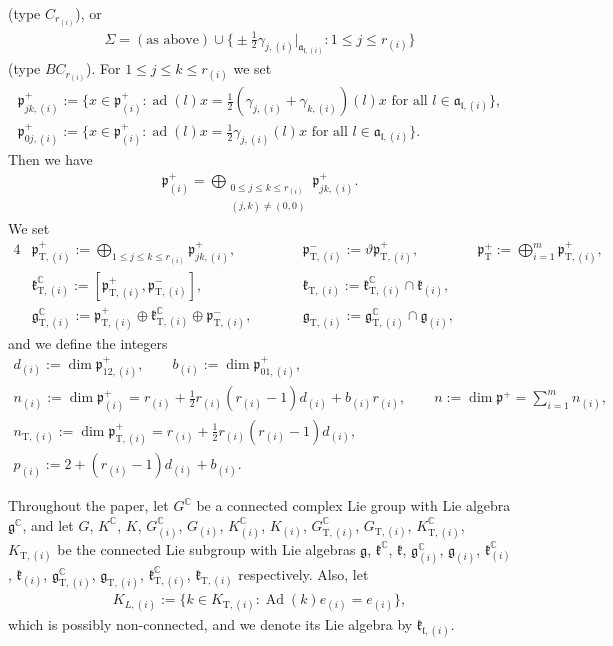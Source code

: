 \documentclass[11pt]{article}
\numberwithin{equation}{section}
\newcommand{\BC}{\mathbb{C}}
\newcommand{\fa}{\mathfrak{a}}
\newcommand{\fg}{\mathfrak{g}}
\newcommand{\fk}{\mathfrak{k}}
\newcommand{\fl}{\mathfrak{l}}
\newcommand{\fp}{\mathfrak{p}}
\newcommand{\rT}{\mathrm{T}}
\begin{document}
(type $C_{r_{(i)}}$), or
\begin{gather*} \Sigma=(\text{as above})\cup\big\{ {\pm}\tfrac{1}{2}\gamma_{j,(i)}\big|_{\fa_{\fl,(i)}}\colon 1\le j\le r_{(i)}\big\} \end{gather*}
(type $BC_{r_{(i)}}$). For $1\le j\le k\le r_{(i)}$ we set
\begin{gather*}
\fp^+_{jk,(i)} :=\big\{x\in\fp^+_{(i)}\colon \operatorname{ad}(l)x=\tfrac{1}{2}(\gamma_{j,(i)}+\gamma_{k,(i)})(l)x\text{ for all }l\in\fa_{\fl,(i)}\big\},\\
\fp^+_{0j,(i)} :=\big\{x\in\fp^+_{(i)}\colon \operatorname{ad}(l)x=\tfrac{1}{2}\gamma_{j,(i)}(l)x\text{ for all } l\in\fa_{\fl,(i)}\big\}.
\end{gather*}
Then we have
\begin{gather*} \fp^+_{(i)}=\bigoplus_{\substack{0\le j\le k\le r_{(i)}\\ (j,k)\ne (0,0)}}\fp^+_{jk,(i)}. \end{gather*}
We set
\begin{alignat*}{4}
&\fp^+_{\rT,(i)}:=\bigoplus_{1\le j\le k\le r_{(i)}}\fp^+_{jk,(i)},\qquad &&
\fp^-_{\rT,(i)}:=\vartheta\fp^+_{\rT,(i)},\qquad &&
\fp^+_{\rT}:=\bigoplus_{i=1}^m \fp^+_{\rT,(i)}, &\\
&\fk^\BC_{\rT,(i)}:=[\fp^+_{\rT,(i)},\fp^-_{\rT,(i)}], \qquad && \fk_{\rT,(i)} :=\fk^\BC_{\rT,(i)}\cap \fk_{(i)}, &&&\\
& \fg^\BC_{\rT,(i)}:=\fp^+_{\rT,(i)}\oplus \fk^\BC_{\rT,(i)}\oplus \fp^-_{\rT,(i)},\qquad && \fg_{\rT,(i)}:=\fg^\BC_{\rT,(i)}\cap \fg_{(i)},&&&
\end{alignat*}
and we define the integers
\begin{gather*}
d_{(i)} :=\dim\fp^+_{12,(i)},\qquad b_{(i)}:=\dim\fp^+_{01,(i)},\\
n_{(i)}:=\dim\fp^+_{(i)}=r_{(i)}+\tfrac{1}{2}r_{(i)}(r_{(i)}-1)d_{(i)}+b_{(i)}r_{(i)},\qquad
n:=\dim\fp^+=\sum_{i=1}^m n_{(i)},\\
n_{\rT,(i)}:=\dim\fp^+_{\rT,(i)}=r_{(i)}+\tfrac{1}{2}r_{(i)}(r_{(i)}-1)d_{(i)},\\
p_{(i)}:=2+(r_{(i)}-1)d_{(i)}+b_{(i)}.
\end{gather*}

Throughout the paper, let $G^\BC$ be a connected complex Lie group with Lie algebra $\fg^\BC$, and let
$G$, $K^\BC$, $K$, $G^\BC_{(i)}$, $G_{(i)}$, $K^\BC_{(i)}$, $K_{(i)}$, $G^\BC_{\rT,(i)}$, $G_{\rT,(i)}$, $K^\BC_{\rT,(i)}$, $K_{\rT,(i)}$
be the connected Lie subgroup with Lie algebras
$\fg$, $\fk^\BC$, $\fk$, $\fg^\BC_{(i)}$, $\fg_{(i)}$, $\fk^\BC_{(i)}$, $\fk_{(i)}$,
$\fg^\BC_{\rT,(i)}$, $\fg_{\rT,(i)}$, $\fk^\BC_{\rT,(i)}$, $\fk_{\rT,(i)}$ respectively.
Also, let
\begin{gather*} K_{L,(i)}:=\big\{ k\in K_{\rT,(i)}\colon \operatorname{Ad}(k)e_{(i)}=e_{(i)}\big\}, \end{gather*}
which is possibly non-connected, and we denote its Lie algebra by $\fk_{\fl,(i)}$.
\end{document}

